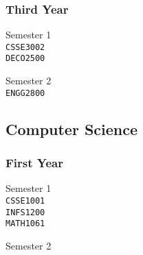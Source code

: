 \subsubsection{Third Year}
\begin{multicols}{2}
\centering
Semester 1 \\
\texttt{CSSE3002} \\
\texttt{DECO2500} \\
\vfill
\columnbreak

Semester 2 \\
\texttt{ENGG2800} \\
\end{multicols}

\subsection{Computer Science}

\subsubsection{First Year}
\begin{multicols}{2}
\centering
Semester 1 \\
\texttt{CSSE1001} \\
\texttt{INFS1200} \\
\texttt{MATH1061} \\
\vfill
\columnbreak

Semester 2 \\
\end{multicols}

